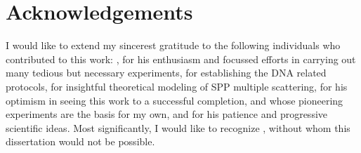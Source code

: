 \chapter*{Acknowledgements}
I would like to extend my sincerest gratitude to the following individuals
who contributed to this work: , for his enthusiasm
and focussed efforts in carrying out many tedious but necessary experiments,
 for establishing the DNA related protocols,
 for insightful theoretical modeling
of SPP multiple scattering,  for his optimism
in seeing this work to a successful completion, 
and  whose pioneering experiments are the basis
for my own, and  for his patience and progressive
scientific ideas. Most significantly, I would like to recognize
, without whom this dissertation would not be
possible.
